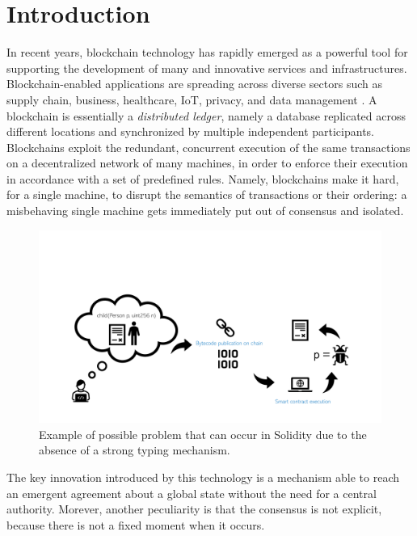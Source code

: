 \section{Introduction}\label{sec:introduction}

In recent years, blockchain technology has rapidly emerged as a powerful tool for supporting the development of many and innovative services and infrastructures. Blockchain-enabled applications are spreading across diverse sectors such as supply chain, business, healthcare, IoT, privacy, and data management \cite{blockchain_applications}. A blockchain is essentially a \textit{distributed ledger}, namely a database replicated across different locations and synchronized by multiple independent participants. Blockchains exploit the redundant, concurrent execution of the same transactions on a decentralized network of many machines, in order to enforce their execution in accordance with a set of predefined rules. Namely, blockchains make it hard, for a single machine, to disrupt the semantics of transactions or their ordering: a misbehaving single machine gets immediately put out of consensus and isolated. 
%
\begin{figure}[th]
\centering
\includegraphics[width=0.8\linewidth]{figures/solidity_problem}
\caption{Example of possible problem that can occur in Solidity due to the absence of a strong typing mechanism.}
\label{figure.solidity_problem}
\end{figure}
%
The key innovation introduced by this technology is a mechanism  able to reach an emergent agreement about a global state without the need for a central authority. Morever, another peculiarity is that the consensus is not explicit, because there is not a fixed moment when it occurs.

